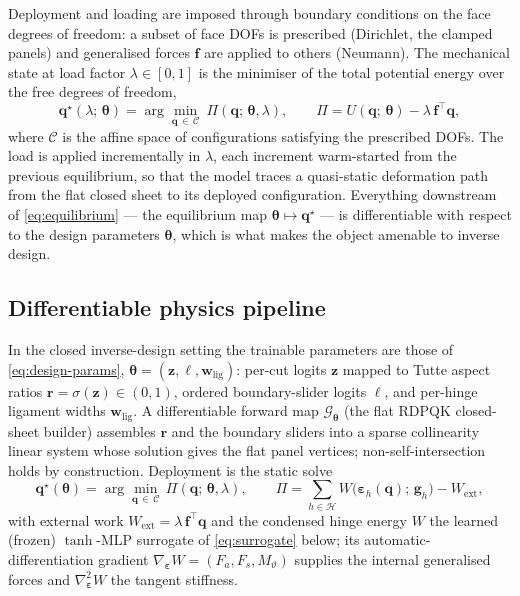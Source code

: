 \documentclass[pdflatex,sn-mathphys-num]{sn-jnl}%
\theoremstyle{thmstyleone}%
\theoremstyle{thmstyletwo}%
\theoremstyle{thmstylethree}%
\begin{document}
Deployment and loading are imposed through boundary conditions on the face
degrees of freedom: a subset of face DOFs is prescribed (Dirichlet, the clamped
panels) and generalised forces $\bm{f}$ are applied to others (Neumann). The
mechanical state at load factor $\lambda\in[0,1]$ is the minimiser of the total
potential energy over the free degrees of freedom,
\begin{equation}
  \bm{q}^\star(\lambda;\,\bm{\theta})
    = \arg\min_{\bm{q}\,\in\,\mathcal{C}}
      \ \Pi(\bm{q};\,\bm{\theta},\lambda),
  \qquad
  \Pi = U(\bm{q};\,\bm{\theta}) - \lambda\,\bm{f}^\top \bm{q},
  \label{eq:equilibrium}
\end{equation}
where $\mathcal{C}$ is the affine space of configurations satisfying the
prescribed DOFs. The load is applied incrementally in $\lambda$, each increment
warm-started from the previous equilibrium, so that the model traces a
quasi-static deformation path from the flat closed sheet to its deployed
configuration. Everything downstream of \eqref{eq:equilibrium} --- the equilibrium
map $\bm{\theta} \mapsto \bm{q}^\star$ --- is differentiable with respect to the
design parameters $\bm{\theta}$, which is what makes the object amenable to
inverse design.


\subsection{Differentiable physics pipeline}

In the closed inverse-design setting the trainable parameters are those of
\eqref{eq:design-params}, $\bm{\theta}=(\bm{z},\bm{\ell},\bm{w}_{\mathrm{lig}})$:
per-cut logits $\bm{z}$ mapped to Tutte aspect ratios
$\bm{r}=\sigma(\bm{z})\in(0,1)$, ordered boundary-slider logits $\bm{\ell}$, and
per-hinge ligament widths $\bm{w}_{\mathrm{lig}}$. A differentiable forward map
$\mathcal{G}_{\bm{\theta}}$ (the flat RDPQK closed-sheet builder) assembles
$\bm{r}$ and the boundary sliders into a sparse collinearity linear system whose
solution gives the flat panel vertices; non-self-intersection holds by
construction. Deployment is the static solve
\begin{equation}
  \bm{q}^\star(\bm{\theta})
    = \arg\min_{\bm{q}\,\in\,\mathcal{C}}\,\Pi(\bm{q};\,\bm{\theta},\lambda),
  \qquad
  \Pi = \sum_{h\in\mathcal{H}} W\!\bigl(\bm{\varepsilon}_h(\bm{q});\,\bm{g}_h\bigr)
        - W_{\mathrm{ext}},
  \label{eq:pipeline-solve}
\end{equation}
with external work $W_{\mathrm{ext}}=\lambda\,\bm{f}^\top\bm{q}$ and the condensed
hinge energy $W$ the learned (frozen) $\tanh$-MLP surrogate of
\eqref{eq:surrogate} below; its automatic-differentiation gradient
$\nabla_{\bm{\varepsilon}} W=(F_a,F_s,M_\vartheta)$ supplies the internal
generalised forces and $\nabla^2_{\bm{\varepsilon}} W$ the tangent stiffness.
\end{document}
